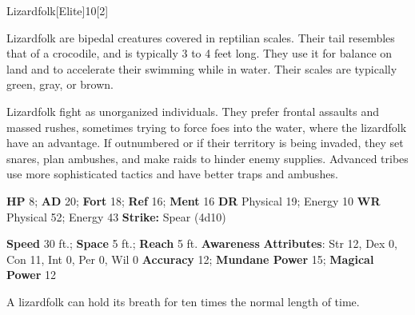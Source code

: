   \begin{monsection}{Lizardfolk}[Elite]{10}[2]
    \vspace{-1em}\vspace{-1em}
    \vspace{0em}

    
    Lizardfolk are bipedal creatures covered in reptilian scales.
    Their tail resembles that of a crocodile, and is typically 3 to 4 feet long.
    They use it for balance on land and to accelerate their swimming while in water.
    Their scales are typically green, gray, or brown.

    Lizardfolk fight as unorganized individuals.
    They prefer frontal assaults and massed rushes, sometimes trying to force foes into the water, where the lizardfolk have an advantage.
    If outnumbered or if their territory is being invaded, they set snares, plan ambushes, and make raids to hinder enemy supplies.
    Advanced tribes use more sophisticated tactics and have better traps and ambushes.
  

    \begin{spellcontent}
      \begin{spelltargetinginfo}
        \pari \textbf{HP} 8;
          \textbf{AD} 20;
          \textbf{Fort} 18;
          \textbf{Ref} 16;
          \textbf{Ment} 16
        \pari \textbf{DR} Physical 19; Energy 10
        \pari \textbf{WR} Physical 52; Energy 43
        \pari \textbf{Strike:}
            Spear  (4d10)
      \end{spelltargetinginfo}
    \end{spellcontent}
    \begin{monsterfooter}
      \pari \textbf{Speed} 30 ft.;
        \textbf{Space} 5 ft.;
        \textbf{Reach} 5 ft.
      \pari \textbf{Awareness} 
      \pari \textbf{Attributes}:
        Str 12, Dex 0,
        Con 11, Int 0,
        Per 0, Wil 0
      \pari \textbf{Accuracy} 12;
        \textbf{Mundane Power} 15;
      \textbf{Magical Power} 12
    \end{monsterfooter}
  \end{monsection}
   A lizardfolk can hold its breath for ten times the normal length of time.
  

